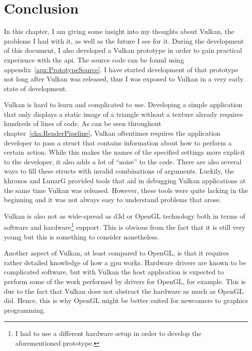 
\chapter{Conclusion}
\label{cha:Conclusion}

  In this chapter, I am giving some insight into my thoughts about Vulkan, the problems I had with it, as well as the future I see for it.
  During the development of this document, I also developed a Vulkan prototype in order to gain practical experience with the \gls{api}.
  The source code can be found using appendix~\ref{apx:PrototypeSource}.
  I have started development of that prototype not long after Vulkan was released, thus I was exposed to Vulkan in a very early state of development.

  Vulkan is hard to learn and complicated to use.
  Developing a simple application that only displays a static image of a triangle without a texture already requires hundreds of lines of code.
  As can be seen throughout chapter~\ref{cha:RenderPipeline}, Vulkan oftentimes requires the application developer to pass a struct that contains information about how to perform a certain action.
  While this makes the names of the specified settings more explicit to the developer, it also adds a lot of ``noise'' to the code.
  There are also several ways to fill these structs with invalid combinations of arguments.
  Luckily, the \gls{khronos} and LunarG provided tools that aid in debugging Vulkan applications at the same time Vulkan was released.
  However, these tools were quite lacking in the beginning and it was not always easy to understand problems that arose.

  Vulkan is also not as wide-spread as \gls{d3d} or OpenGL technology both in terms of software and hardware\footnote{I had to use a different hardware setup in order to develop the aforementioned prototype.} support.
  This is obvious from the fact that it is still very young but this is something to consider nonetheless.

  Another aspect of Vulkan, at least compared to OpenGL, is that it requires rather detailed knowledge of how a \gls{gpu} works.
  Hardware drivers are known to be complicated software, but with Vulkan the host application is expected to perform some of the work performed by drivers for OpenGL, for example.
  This is due to the fact that Vulkan does not abstract the hardware as much as OpenGL did.
  Hence, this is why OpenGL might be better suited for newcomers to graphics programming.

